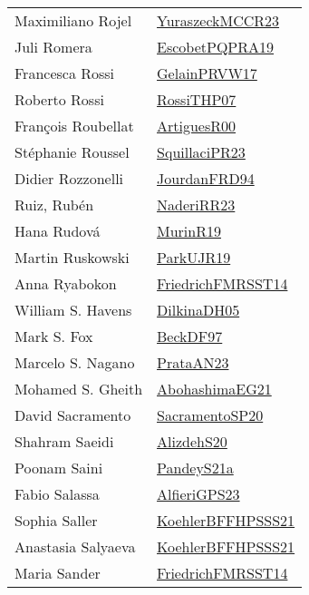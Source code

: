 {\begin{longtable}{p{4cm}p{20cm}}
Maximiliano Rojel & \href{articles/YuraszeckMCCR23.pdf}{YuraszeckMCCR23}\cite{YuraszeckMCCR23} \\
Juli Romera & \href{articles/EscobetPQPRA19.pdf}{EscobetPQPRA19}\cite{EscobetPQPRA19} \\
Francesca Rossi & \href{papers/GelainPRVW17.pdf}{GelainPRVW17}\cite{GelainPRVW17} \\
Roberto Rossi & \href{papers/RossiTHP07.pdf}{RossiTHP07}\cite{RossiTHP07} \\
Fran{\c{c}}ois Roubellat & \href{articles/ArtiguesR00.pdf}{ArtiguesR00}\cite{ArtiguesR00} \\
St{\'{e}}phanie Roussel & \href{papers/SquillaciPR23.pdf}{SquillaciPR23}\cite{SquillaciPR23} \\
Didier Rozzonelli & \href{}{JourdanFRD94}\cite{JourdanFRD94} \\
Ruiz, Rub\'{e}n & \href{articles/NaderiRR23.pdf}{NaderiRR23}\cite{NaderiRR23} \\
Hana Rudov{\'{a}} & \href{papers/MurinR19.pdf}{MurinR19}\cite{MurinR19} \\
Martin Ruskowski & \href{papers/ParkUJR19.pdf}{ParkUJR19}\cite{ParkUJR19} \\
Anna Ryabokon & \href{}{FriedrichFMRSST14}\cite{FriedrichFMRSST14} \\
William S. Havens & \href{papers/DilkinaDH05.pdf}{DilkinaDH05}\cite{DilkinaDH05} \\
Mark S. Fox & \href{papers/BeckDF97.pdf}{BeckDF97}\cite{BeckDF97} \\
Marcelo S. Nagano & \href{articles/PrataAN23.pdf}{PrataAN23}\cite{PrataAN23} \\
Mohamed S. Gheith & \href{articles/AbohashimaEG21.pdf}{AbohashimaEG21}\cite{AbohashimaEG21} \\
David Sacramento & \href{articles/SacramentoSP20.pdf}{SacramentoSP20}\cite{SacramentoSP20} \\
Shahram Saeidi & \href{}{AlizdehS20}\cite{AlizdehS20} \\
Poonam Saini & \href{articles/PandeyS21a.pdf}{PandeyS21a}\cite{PandeyS21a} \\
Fabio Salassa & \href{articles/AlfieriGPS23.pdf}{AlfieriGPS23}\cite{AlfieriGPS23} \\
Sophia Saller & \href{articles/KoehlerBFFHPSSS21.pdf}{KoehlerBFFHPSSS21}\cite{KoehlerBFFHPSSS21} \\
Anastasia Salyaeva & \href{articles/KoehlerBFFHPSSS21.pdf}{KoehlerBFFHPSSS21}\cite{KoehlerBFFHPSSS21} \\
Maria Sander & \href{}{FriedrichFMRSST14}\cite{FriedrichFMRSST14} \\

\end{longtable}}
